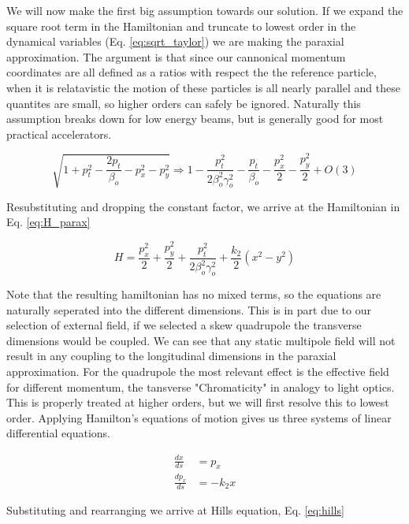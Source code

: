 We will now make the first big assumption towards our solution. If we expand the square root term in the Hamiltonian and truncate to lowest order in the dynamical variables (Eq. \ref{eq:sqrt_taylor}) we are making the paraxial approximation. The argument is that since our cannonical momentum coordinates are all defined as a ratios with respect the the reference particle, when it is relatavistic the motion of these particles is all nearly parallel and these quantites are small, so higher orders can safely be ignored. Naturally this assumption breaks down for low energy beams, but is generally good for most practical accelerators.

\begin{equation} \label{eq:sqrt_taylor}
	\sqrt{1 + p_t^2 - \frac{2p_t}{\beta_o} - p_x^2 - p_y^2} \Rightarrow 1 - \frac{p_t^2}{2\beta_o^2\gamma_o^2} - \frac{p_t}{\beta_o} - \frac{p_x^2}{2} - \frac{p_y^2}{2} + O(3)
\end{equation}

Resubstituting and dropping the constant factor, we arrive at the Hamiltonian in Eq. \ref{eq:H_parax}

\begin{equation} \label{eq:H_parax}
	H = \frac{p_x^2}{2} + \frac{p_y^2}{2} + \frac{p_t^2}{2\beta_o^2\gamma_o^2} + \frac{k_2}{2}(x^2 - y^2)
\end{equation}

Note that the resulting hamiltonian has no mixed terms, so the equations are naturally seperated into the different dimensions. This is in part due to our selection of external field, if we selected a skew quadrupole the transverse dimensions would be coupled. We can see that any static multipole field will not result in any coupling to the longitudinal dimensions in the paraxial approximation. For the quadrupole the most relevant effect is the effective field for different momentum, the tansverse "Chromaticity" in analogy to light optics. This is properly treated at higher orders, but we will first resolve this to lowest order. Applying Hamilton's equations of motion gives us three systems of linear differential equations.

\begin{equation} \label{eq:quad_diffeq}
\begin{split}
	\frac{dx}{ds} &= p_x\\ 
	\frac{dp_x}{ds} &= -k_2 x
\end{split}
\end{equation}

Substituting and rearranging we arrive at Hills equation, Eq. \ref{eq:hills}


